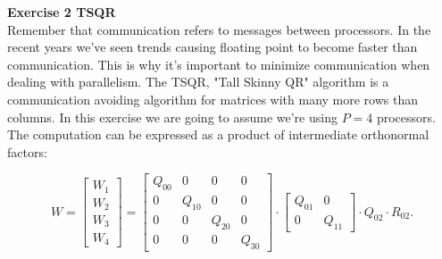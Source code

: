 \documentclass[11pt]{article}
\begin{document}
\bigskip

{\bf{Exercise 2 TSQR}}\\

Remember that communication refers to messages between processors. In the recent years we've seen trends causing floating point to become faster than communication. This is why it's important to minimize communication when dealing with parallelism. The TSQR, "Tall Skinny QR" algorithm is a communication avoiding algorithm for matrices with many more rows than columns. In this exercise we are going to assume we're using $P=4$ processors. The computation can be expressed as a product of intermediate orthonormal factors:

\[ W = \begin{bmatrix} W_1 \\ W_2 \\ W_3 \\ W_4 \end{bmatrix} = \begin{bmatrix} Q_{00} & 0 & 0 & 0 \\ 0 & Q_{10} & 0 & 0 \\ 0 & 0 & Q_{20} & 0 \\ 0 & 0 & 0 & Q_{30} \end{bmatrix} \cdot \begin{bmatrix} Q_{01} & 0 \\ 0 & Q_{11} \end{bmatrix} \cdot Q_{02} \cdot R_{02}. \]
\end{document}
